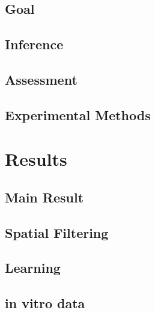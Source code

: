 \subsection{Goal} \label{sec:goal}


\subsection{Inference} \label{sec:inf}


\subsection{Assessment} \label{sec:ass}


\subsection{Experimental Methods} \label{sec:exp}


\newpage
\section{Results} \label{sec:results}
\subsection{Main Result} \label{sec:main}


%

\clearpage\newpage
\subsection{Spatial Filtering} \label{sec:spatial}


\clearpage\newpage
\subsection{Learning} \label{sec:learn}


\clearpage\newpage
\subsection{in vitro data} \label{sec:vitro}


